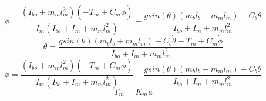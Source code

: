 \documentclass[12pt]{article}
\begin{document}
		\begin{equation}
			\ddot\phi = \frac{(I_{bo}+m_ml_m^2)(-T_m+C_m\dot\phi)}{I_m(I_{bo}+I_m+m_ml_m^2)} - \frac{gsin(\theta)(m_bl_b+m_ml_m)-C_b\dot\theta}{I_{bo}+I_m+m_ml_m^2}
		\end{equation}
		\begin{equation}
			\boxed{\ddot\theta = \frac{gsin(\theta)(m_bl_b + m_ml_m) - C_b \dot\theta - T_m + C_m \dot\phi}{I_{bo}+I_m+m_ml_m^2}}
		\end{equation}
		\begin{equation}
			\boxed{\ddot\phi = \frac{(I_{bo}+m_ml_m^2)(-T_m+C_m\dot\phi)}{I_m(I_{bo}+I_m+m_ml_m^2)} - \frac{gsin(\theta)(m_bl_b+m_ml_m)-C_b\dot\theta}{I_{bo}+I_m+m_ml_m^2}}
		\end{equation}
		\begin{equation}
			\boxed{T_m = K_m u}
		\end{equation}
\end{document}
